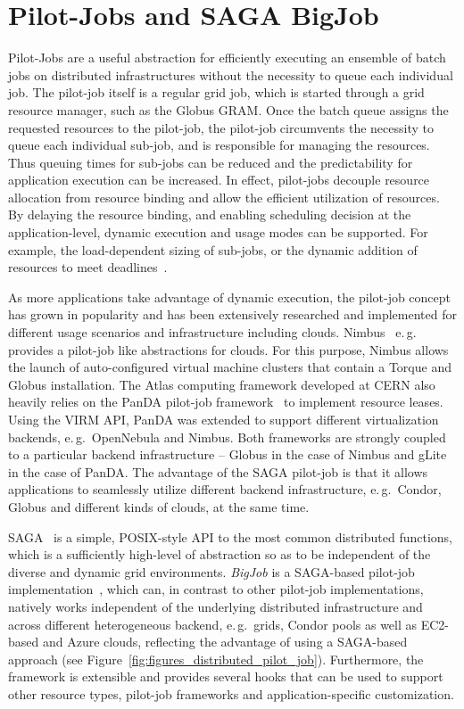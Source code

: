 \documentclass[conference,final]{IEEEtran}
\newcommand{\up}{\vspace*{-1em}}
\begin{document}
\up
\section{Pilot-Jobs and SAGA BigJob}
\label{sec:pilot-bj}
\up

Pilot-Jobs are a useful abstraction for efficiently executing an
ensemble of batch jobs on distributed infrastructures without the
necessity to queue each individual job.  The pilot-job itself is a
regular grid job, which is started through a grid resource manager,
such as the Globus GRAM.  Once the batch queue assigns the requested
resources to the pilot-job, the pilot-job circumvents the necessity to
queue each individual sub-job, and is responsible for managing the
resources.  Thus queuing times for sub-jobs can be reduced and the
predictability for application execution can be increased. In effect,
pilot-jobs decouple resource allocation from resource binding and
allow the efficient utilization of resources. By delaying the resource
binding, and enabling scheduling decision at the application-level,
dynamic execution and usage modes can be supported.  For example, the
load-dependent sizing of sub-jobs, or the dynamic addition of
resources to meet deadlines~\cite{10.1109/CCGRID.2010.91}.

As more applications take advantage of dynamic execution, the
pilot-job concept has grown in popularity and has been extensively
researched and implemented for different usage scenarios and
infrastructure including clouds.  Nimbus~\cite{10.1109/MIC.2009.94}
e.\,g. provides a pilot-job like abstractions for clouds. For this
purpose, Nimbus allows the launch of auto-configured virtual machine
clusters that contain a Torque and Globus installation.  The Atlas
computing framework developed at CERN also heavily relies on the PanDA
pilot-job framework~\cite{1742-6596-219-6-062041} to implement
resource leases. Using the VIRM API, PanDA was extended to support
different virtualization backends, e.\,g.\ OpenNebula and Nimbus. Both
frameworks are strongly coupled to a particular backend infrastructure
-- Globus in the case of Nimbus and gLite in the case of PanDA. The
advantage of the SAGA pilot-job is that it allows applications to
seamlessly utilize different backend infrastructure, e.\,g.\ Condor,
Globus and different kinds of clouds, at the same time.

SAGA~\cite{saga_url} is a simple, POSIX-style API to the most common
distributed functions, which is a sufficiently high-level of
abstraction so as to be independent of the diverse and dynamic grid
environments.  \emph{BigJob} is a SAGA-based pilot-job
implementation~\cite{10.1109/CCGRID.2010.91}, which can, in contrast
to other pilot-job implementations, natively works independent of the
underlying distributed infrastructure and across different
heterogeneous backend, e.\,g.\ grids, Condor pools as well as
EC2-based and Azure clouds, reflecting the advantage of using a
SAGA-based approach (see
Figure~\ref{fig:figures_distributed_pilot_job}). Furthermore, the
framework is extensible and provides several hooks that can be used to
support other resource types, pilot-job frameworks and
application-specific customization.
\end{document}
